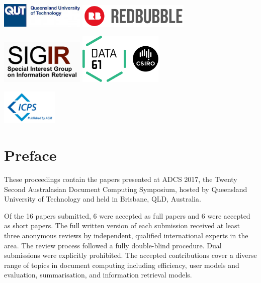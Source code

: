 \documentclass[a4paper]{article}
\begin{document}
\begin{center}
\includegraphics[width=0.3\textwidth]{qut_logo_2lines.jpg} \hspace{4em}
\includegraphics[width=0.4\textwidth]{redbubble.png} 


\vspace{1em}

\includegraphics[width=0.3\textwidth]{sigir-logo.png} \hspace{4em}
\includegraphics[width=0.3\textwidth]{csiro-logo}
\end{center}

\vspace{1in}

\hfill\includegraphics[width=0.2\textwidth]{icps-logo}

\newpage

\section*{Preface}

These proceedings contain the papers presented at ADCS 2017, the Twenty Second 
Australasian Document Computing Symposium, hosted by Queensland University of Technology 
and held in Brisbane, QLD, Australia.

Of the 16 papers submitted, 6 were accepted as full papers and 6 were accepted
as short papers. The full  written  version  of each submission received at
least three anonymous reviews by independent, qualified international experts
in the area. The review process followed a fully double-blind procedure. Dual submissions were explicitly prohibited.  The accepted
contributions cover a diverse range of topics in document computing including efficiency, user models and evaluation, summarisation, and information retrieval
models.
\end{document}
